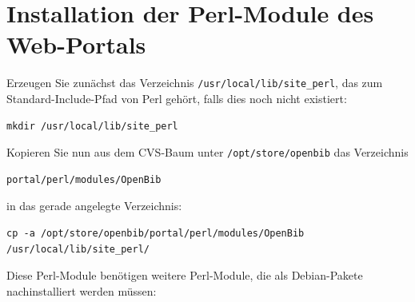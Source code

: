 \documentclass[11pt, twoside, a4paper, BCOR8mm, DIV12, bibtotoc,idxtotoc]{scrbook}
\begin{document}
\section{Installation der Perl-Module des Web-Portals}

Erzeugen Sie zunächst das Verzeichnis \texttt{/usr/local/lib/site\_perl}, das
zum Standard-Include-Pfad von Perl gehört, falls dies noch nicht
existiert:

\begin{verbatim}
mkdir /usr/local/lib/site_perl
\end{verbatim}

Kopieren Sie nun aus dem CVS-Baum unter \texttt{/opt/store/openbib}
das Verzeichnis 

\begin{verbatim}
portal/perl/modules/OpenBib
\end{verbatim}

in das gerade angelegte Verzeichnis:

\begin{verbatim}
cp -a /opt/store/openbib/portal/perl/modules/OpenBib /usr/local/lib/site_perl/
\end{verbatim}

Diese Perl-Module benötigen weitere Perl-Module, die als
Debian-Pakete nachinstalliert werden müssen:
\end{document}
